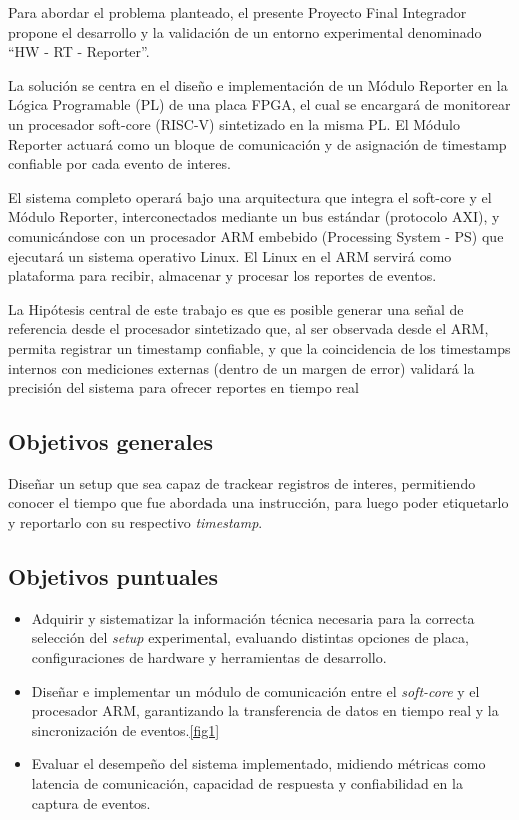 Para abordar el problema planteado, el presente Proyecto Final Integrador propone el desarrollo y la validación de un entorno experimental denominado ``HW - RT - Reporter''.

La solución se centra en el diseño e implementación de un Módulo Reporter en la Lógica Programable (PL) de una placa FPGA, el cual se encargará de monitorear un procesador soft-core (RISC-V) sintetizado en la misma PL. El Módulo Reporter actuará como un bloque de comunicación y de asignación de timestamp confiable por cada evento de interes.

El sistema completo operará bajo una arquitectura que integra el soft-core y el Módulo Reporter, interconectados mediante un bus estándar (protocolo AXI), y comunicándose con un procesador ARM embebido (Processing System - PS) que ejecutará un sistema operativo Linux. El Linux en el ARM servirá como plataforma para recibir, almacenar y procesar los reportes de eventos.

La Hipótesis central de este trabajo es que es posible generar una señal de referencia desde el procesador sintetizado que, al ser observada desde el ARM, permita registrar un timestamp confiable, y que la coincidencia de los timestamps internos con mediciones externas (dentro de un margen de error) validará la precisión del sistema para ofrecer reportes en tiempo real


\subsection*{Objetivos generales}
\label{S:doble-faz}

Diseñar un setup que sea capaz de trackear registros de interes, permitiendo conocer el tiempo que fue abordada una instrucción, para luego poder etiquetarlo y reportarlo con su respectivo \textit{timestamp}.

\subsection{Objetivos puntuales}

\begin{itemize}
\item Adquirir y sistematizar la información técnica necesaria para la correcta selección del \textit{setup} experimental, evaluando distintas opciones de placa, configuraciones de hardware y herramientas de desarrollo.
        
\item Diseñar e implementar un módulo de comunicación entre el \textit{soft-core} y el procesador ARM, garantizando la transferencia de datos en tiempo real y la sincronización de eventos.\ref{fig1}

\item Evaluar el desempeño del sistema implementado, midiendo métricas como latencia de comunicación, capacidad de respuesta y confiabilidad en la captura de eventos.
\end{itemize}

